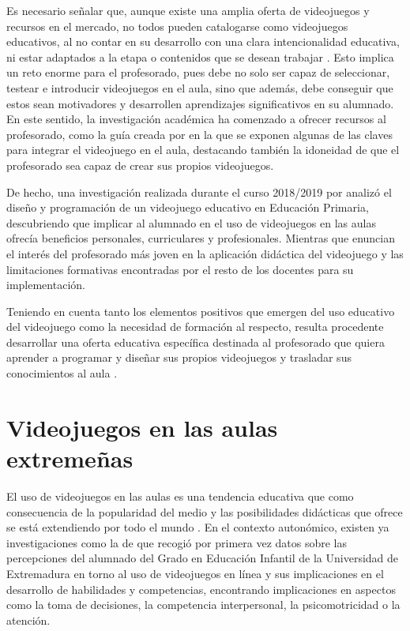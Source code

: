 \documentclass[spanish]{textolivre}
\begin{document}
Es necesario señalar que, aunque existe una amplia oferta de videojuegos y recursos en el mercado, no todos pueden catalogarse como videojuegos educativos, al no contar en su desarrollo con una clara intencionalidad educativa, ni estar adaptados a la etapa o contenidos que se desean trabajar \cite{estallo1995videojuegos}. Esto implica un reto enorme para el profesorado, pues debe no solo ser capaz de seleccionar, testear e introducir videojuegos en el aula, sino que además, debe conseguir que estos sean motivadores y desarrollen aprendizajes significativos en su alumnado. En este sentido, la investigación académica ha comenzado a ofrecer recursos al profesorado, como la guía creada por \textcite{lopez2023videojuegos} en la que se exponen algunas de las claves para integrar el videojuego en el aula, destacando también la idoneidad de que el profesorado sea capaz de crear sus propios videojuegos.

De hecho, una investigación realizada durante el curso 2018/2019 por \textcite{gonzalez2023diseno} analizó el diseño y programación de un videojuego educativo en Educación Primaria, descubriendo que implicar al alumnado en el uso de videojuegos en las aulas ofrecía beneficios personales, curriculares y profesionales. Mientras que \textcite{gerardo2022videojuego} enuncian el interés del profesorado más joven en la aplicación didáctica del videojuego y las limitaciones formativas encontradas por el resto de los docentes para su implementación.

Teniendo en cuenta tanto los elementos positivos que emergen del uso educativo del videojuego como la necesidad de formación al respecto, resulta procedente desarrollar una oferta educativa específica destinada al profesorado que quiera aprender a programar y diseñar sus propios videojuegos y trasladar sus conocimientos al aula \cite{gonzalez2023diseno}.

\section{Videojuegos en las aulas extremeñas}\label{sec-normas}
El uso de videojuegos en las aulas es una tendencia educativa que como consecuencia de la popularidad del medio y las posibilidades didácticas que ofrece se está extendiendo por todo el mundo \cite{mielgo2022revision}. En el contexto autonómico, existen ya investigaciones como la de \textcite{pedrera2017percepcion} que recogió por primera vez datos sobre las percepciones del alumnado del Grado en Educación Infantil de la Universidad de Extremadura en torno al uso de videojuegos en línea y sus implicaciones en el desarrollo de habilidades y competencias, encontrando implicaciones en aspectos como la toma de decisiones, la competencia interpersonal, la psicomotricidad o la atención.
\end{document}
